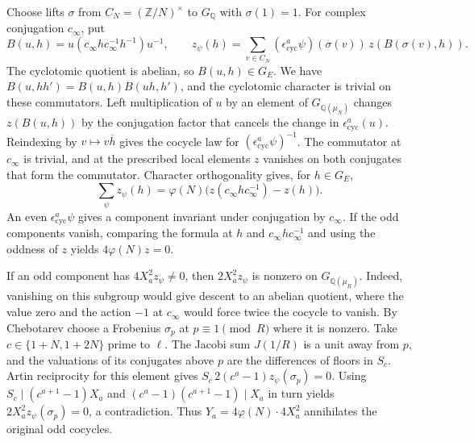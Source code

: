 Choose lifts \(\sigma\) from \(C_N=(\mathbb Z/N)^\times\) to \(G_{\mathbb Q}\) with \(\sigma(1)=1\).
For complex conjugation \(c_\infty\), put
\[
 B(u,h)=u(c_\infty h c_\infty^{-1}h^{-1})u^{-1},\qquad
 z_\psi(h)=\sum_{v\in C_N}(\epsilon_{\mathrm{cyc}}^a\psi)(\sigma(v))\,z(B(\sigma(v),h)).
\]
The cyclotomic quotient is abelian, so \(B(u,h)\in G_E\).
We have \(B(u,hh')=B(u,h)B(uh,h')\), and the cyclotomic character is trivial on these commutators.
Left multiplication of \(u\) by an element of \(G_{\mathbb Q(\mu_N)}\) changes \(z(B(u,h))\)
by the conjugation factor that cancels the change in \(\epsilon_{\mathrm{cyc}}^a(u)\).
Reindexing by \(v\mapsto v\overline h\) gives the cocycle law for \((\epsilon_{\mathrm{cyc}}^a\psi)^{-1}\).
The commutator at \(c_\infty\) is trivial, and at the prescribed local elements \(z\) vanishes
on both conjugates that form the commutator. Character orthogonality gives, for \(h\in G_E\),
\[
 \sum_\psi z_\psi(h)=\varphi(N)\bigl(z(c_\infty h c_\infty^{-1})-z(h)\bigr).
\]
An even \(\epsilon_{\mathrm{cyc}}^a\psi\) gives a component invariant under conjugation by \(c_\infty\).
If the odd components vanish, comparing the formula at \(h\) and \(c_\infty h c_\infty^{-1}\)
and using the oddness of \(z\) yields \(4\varphi(N)z=0\).

If an odd component has \(4X_a^2z_\psi\ne0\), then \(2X_a^2z_\psi\) is nonzero on
\(G_{\mathbb Q(\mu_R)}\). Indeed, vanishing on this subgroup would give descent to an abelian
quotient, where the value zero and the action \(-1\) at \(c_\infty\) would force twice the cocycle
to vanish. By Chebotarev choose a Frobenius \(\sigma_p\) at \(p\equiv1\pmod R\) where it is nonzero.
Take \(c\in\{1+N,1+2N\}\) prime to \(\ell\).
The Jacobi sum \(J(1/R)\) is a unit away from \(p\), and the valuations of its conjugates
above \(p\) are the differences of floors in \(S_c\).
Artin reciprocity for this element gives \(S_c\,2(c^a-1)z_\psi(\sigma_p)=0\).
Using \(S_c\mid(c^{a+1}-1)X_a\) and \((c^a-1)(c^{a+1}-1)\mid X_a\) in turn yields
\(2X_a^2z_\psi(\sigma_p)=0\), a contradiction.
Thus \(Y_a=4\varphi(N)\cdot4X_a^2\) annihilates the original odd cocycles.

